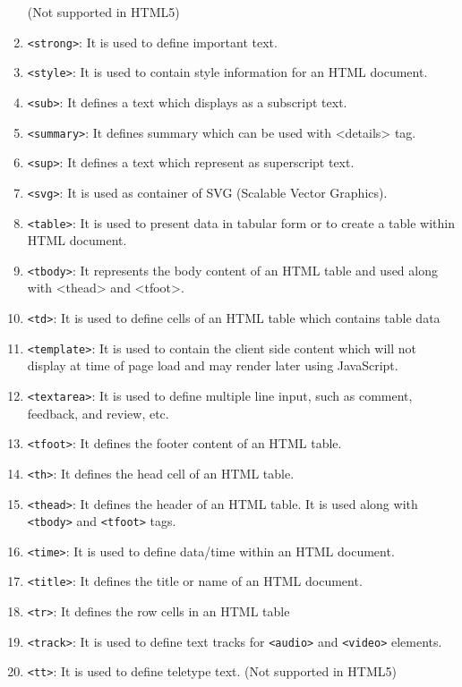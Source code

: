 \documentclass[a4paper]{article}
\begin{document}
\begin{enumerate}
      (Not supported in HTML5)
    \item \texttt{<strong>}: It is used to define important text.
    \item \texttt{<style>}: It is used to contain style information for
      an HTML document.
    \item \texttt{<sub>}: It defines a text which displays as a 
      subscript text.
    \item \texttt{<summary>}: It defines summary which can be used
      with <details> tag.
    \item \texttt{<sup>}: It defines a text which represent as
      superscript text.
    \item \texttt{<svg>}: It is used as container of SVG
      (Scalable Vector Graphics).
    \item \texttt{<table>}: It is used to present data in tabular form
      or to create a table within HTML document.
    \item \texttt{<tbody>}: It represents the body content of an HTML
      table and used along with <thead> and <tfoot>.
    \item \texttt{<td>}: It is used to define cells of an HTML table
      which contains table data
    \item \texttt{<template>}: It is used to contain the client side
      content which will not display at time of page load and may render
      later using JavaScript.
    \item \texttt{<textarea>}: It is used to define multiple line input,
      such as comment, feedback, and review, etc.
    \item \texttt{<tfoot>}: It defines the footer content of an HTML table.
    \item \texttt{<th>}: It defines the head cell of an HTML table.
    \item \texttt{<thead>}: It defines the header of an HTML table.
      It is used along with \texttt{<tbody>} and \texttt{<tfoot>} tags.
    \item \texttt{<time>}: It is used to define data/time within an 
      HTML document.
    \item \texttt{<title>}: It defines the title or name of an HTML document.
    \item \texttt{<tr>}: It defines the row cells in an HTML table
    \item \texttt{<track>}: It is used to define text tracks for
      \texttt{<audio>} and \texttt{<video>} elements.
    \item \texttt{<tt>}: It is used to define teletype text.
      (Not supported in HTML5)


\end{enumerate}
\end{document}
